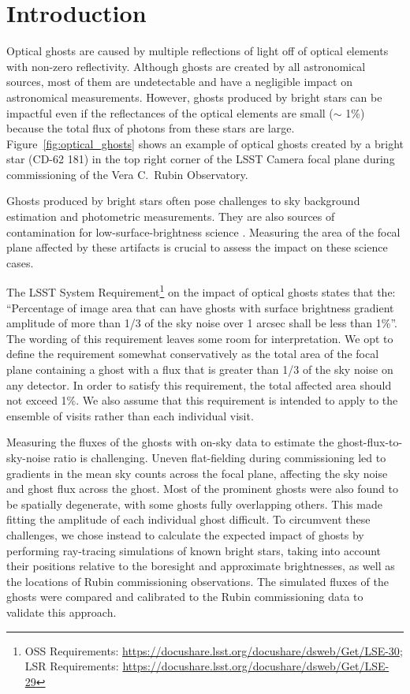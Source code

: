 \section{Introduction}
\label{sec:intro}
Optical ghosts are caused by multiple reflections of light off of optical elements with non-zero reflectivity. Although ghosts are created by all astronomical sources, most of them are undetectable and have a negligible impact on astronomical measurements. However, ghosts produced by bright stars can be impactful even if the reflectances of the optical elements are small ($\sim$ 1\%) because the total flux of photons from these stars are large. Figure~\ref{fig:optical_ghosts} shows an example of optical ghosts created by a bright star (CD-62 181) in the top right corner of the LSST Camera focal plane during commissioning of the Vera C.\ Rubin Observatory. %

Ghosts produced by bright stars often pose challenges to sky background estimation and photometric measurements. They are also sources of contamination for low-surface-brightness science \citep[e.g.,][]{Tanoglidis:2021,Tanoglidis:2022}. Measuring the area of the focal plane affected by these artifacts is crucial to assess the impact on these science cases.

The LSST System Requirement\footnote{OSS Requirements: \url{https://docushare.lsst.org/docushare/dsweb/Get/LSE-30};  LSR Requirements: \url{https://docushare.lsst.org/docushare/dsweb/Get/LSE-29} } on the impact of optical ghosts states that the: ``Percentage of image area that can have ghosts with surface brightness gradient amplitude of more than 1/3 of the sky noise over 1 arcsec shall be less than 1\%''. 
The wording of this requirement leaves some room for interpretation. We opt to define the requirement somewhat conservatively as the total area of the focal plane containing a ghost with a flux that is greater than 1/3 of the sky noise on any detector. In order to satisfy this requirement, the total affected area should not exceed 1\%. We also assume that this requirement is intended to apply to the ensemble of visits rather than each individual visit.

Measuring the fluxes of the ghosts with on-sky data to estimate the ghost-flux-to-sky-noise ratio is challenging. Uneven flat-fielding during commissioning led to gradients in the mean sky counts across the focal plane, affecting the sky noise and ghost flux across the ghost. Most of the prominent ghosts were also found to be spatially degenerate, with some ghosts fully overlapping others. This made fitting the amplitude of each individual ghost difficult. To circumvent these challenges, we chose instead to calculate the expected impact of ghosts by performing ray-tracing simulations of known bright stars, taking into account their positions relative to the boresight and approximate brightnesses, as well as the locations of Rubin commissioning observations. The simulated fluxes of the ghosts were compared and calibrated to the Rubin commissioning data to validate this approach.

